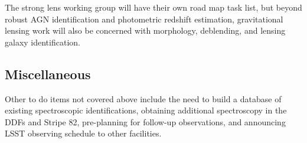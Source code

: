The strong lens working group will have their own road map task list, but beyond robust AGN identification and photometric redshift estimation, gravitational lensing work will also be concerned with morphology, deblending, and lensing galaxy identification.


\subsection{Miscellaneous}

Other to do items not covered above include the need to build a database of existing spectroscopic identifications, obtaining additional spectroscopy in the DDFs and Stripe 82, pre-planning for follow-up observations, and  announcing LSST observing schedule to other facilities.






